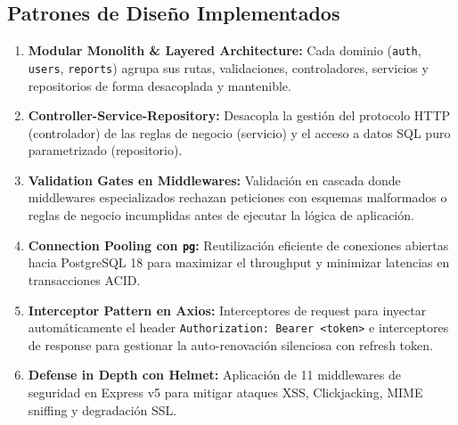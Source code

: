 \documentclass[11pt,a4paper]{article}
\begin{document}
\subsection{Patrones de Diseño Implementados}
\begin{enumerate}[leftmargin=1.5em, itemsep=2.5pt]
    \item \textbf{Modular Monolith \& Layered Architecture:} Cada dominio (\texttt{auth}, \texttt{users}, \texttt{reports}) agrupa sus rutas, validaciones, controladores, servicios y repositorios de forma desacoplada y mantenible.
    \item \textbf{Controller-Service-Repository:} Desacopla la gestión del protocolo HTTP (controlador) de las reglas de negocio (servicio) y el acceso a datos SQL puro parametrizado (repositorio).
    \item \textbf{Validation Gates en Middlewares:} Validación en cascada donde middlewares especializados rechazan peticiones con esquemas malformados o reglas de negocio incumplidas antes de ejecutar la lógica de aplicación.
    \item \textbf{Connection Pooling con \texttt{pg}:} Reutilización eficiente de conexiones abiertas hacia PostgreSQL 18 para maximizar el throughput y minimizar latencias en transacciones ACID.
    \item \textbf{Interceptor Pattern en Axios:} Interceptores de request para inyectar automáticamente el header \texttt{Authorization: Bearer <token>} e interceptores de response para gestionar la auto-renovación silenciosa con refresh token.
    \item \textbf{Defense in Depth con Helmet:} Aplicación de 11 middlewares de seguridad en Express v5 para mitigar ataques XSS, Clickjacking, MIME sniffing y degradación SSL.
\end{enumerate}
\end{document}
